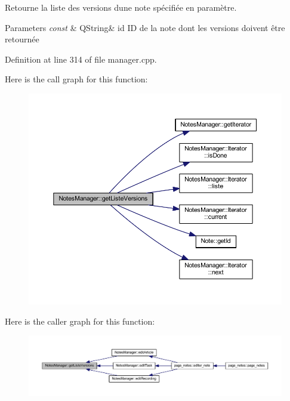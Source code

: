 Retourne la liste des versions d\textquotesingle{}une note spécifiée en paramètre. 


\begin{DoxyParams}{Parameters}
{\em const} & Q\+String\& id ID de la note dont les versions doivent être retournée \\
\hline
\end{DoxyParams}


Definition at line 314 of file manager.\+cpp.

Here is the call graph for this function\+:
\nopagebreak
\begin{figure}[H]
\begin{center}
\leavevmode
\includegraphics[width=350pt]{class_notes_manager_ae3af78108c46b9816207e66fcde64c5b_cgraph}
\end{center}
\end{figure}
Here is the caller graph for this function\+:
\nopagebreak
\begin{figure}[H]
\begin{center}
\leavevmode
\includegraphics[width=350pt]{class_notes_manager_ae3af78108c46b9816207e66fcde64c5b_icgraph}
\end{center}
\end{figure}
\mbox{\label{class_notes_manager_a9f2c72d67d67c89a61f77a9b1a0ae390}} 
